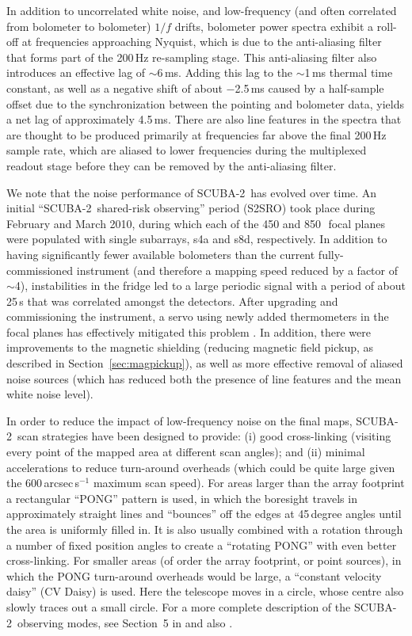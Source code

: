 \documentclass[useAMS,usenatbib,nofootinbib]{mn2e}
\newcommand{\scuba}{SCUBA-2}
\begin{document}
In addition to uncorrelated white noise, and low-frequency (and often
correlated from bolometer to bolometer) $1/f$ drifts, bolometer power
spectra exhibit a roll-off at frequencies approaching Nyquist, which
is due to the anti-aliasing filter that forms part of the 200\,Hz
re-sampling stage. This anti-aliasing filter also introduces an
effective lag of $\sim$6\,ms. Adding this lag to the $\sim$1\,ms
thermal time constant, as well as a negative shift of about $-$2.5\,ms
caused by a half-sample offset due to the synchronization between the
pointing and bolometer data, yields a net lag of approximately
4.5\,ms. There are also line features in the spectra that are thought
to be produced primarily at frequencies far above the final 200\,Hz
sample rate, which are aliased to lower frequencies during the
multiplexed readout stage before they can be removed by the
anti-aliasing filter.

We note that the noise performance of \scuba\ has evolved over
time. An initial ``\scuba\ shared-risk observing'' period (S2SRO) took
place during February and March 2010, during which each of the 450 and
850\,\micron\ focal planes were populated with single subarrays, s4a
and s8d, respectively. In addition to having significantly fewer
available bolometers than the current fully-commissioned instrument
(and therefore a mapping speed reduced by a factor of $\sim$4),
instabilities in the fridge led to a large periodic signal with a
period of about 25\,s that was correlated amongst the detectors. After
upgrading and commissioning the instrument, a servo using newly added
thermometers in the focal planes has effectively mitigated this
problem \citep[Section~2.5 in][]{holland2012}. In addition, there were
improvements to the magnetic shielding (reducing magnetic field
pickup, as described in Section~\ref{sec:magpickup}), as well as more
effective removal of aliased noise sources (which has reduced both the
presence of line features and the mean white noise level).

In order to reduce the impact of low-frequency noise on the final
maps, \scuba\ scan strategies have been designed to provide: (i) good
cross-linking (visiting every point of the mapped area at different
scan angles); and (ii) minimal accelerations to reduce turn-around
overheads (which could be quite large given the 600\,arcsec\,s$^{-1}$
maximum scan speed). For areas larger than the array footprint a
rectangular ``PONG'' pattern is used, in which the boresight travels
in approximately straight lines and ``bounces'' off the edges at
45\,degree angles until the area is uniformly filled in. It is also
usually combined with a rotation through a number of fixed position
angles to create a ``rotating PONG'' with even better
cross-linking. For smaller areas (of order the array footprint, or
point sources), in which the PONG turn-around overheads would be
large, a ``constant velocity daisy'' (CV Daisy) is used.  Here the
telescope moves in a circle, whose centre also slowly traces out a
small circle. For a more complete description of the \scuba\ observing
modes, see Section~5 in \citet{holland2012} and also
\citet{2010SPIE.7740E..66K}.
\end{document}
